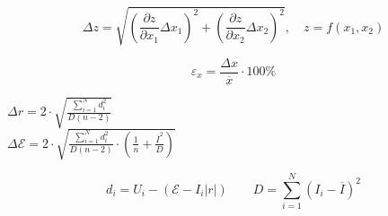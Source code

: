 \[
\Delta z = \sqrt{\left(\frac{\partial z}{\partial x_1} \Delta x_1\right)^2 + \left(\frac{\partial z}{\partial x_2} \Delta x_2\right)^2}, \quad z = f(x_1, x_2)
\]

\vspace{0.1cm}

\[
\varepsilon_x = \frac{\Delta x}{\overline{x}} \cdot 100\%
\]

\vspace{0.1cm}

\begin{center}
    $\Delta r = 2 \cdot \sqrt{\frac{\sum\limits_{i=1}^N d_i^2}{D (n-2)}}$ \\
    $\Delta \mathcal{E} = 2 \cdot \sqrt{\frac{\sum\limits_{i=1}^N d_i^2}{D (n-2)}\cdot \left(\frac{1}{n} + \frac{\overline{I}^2}{D}\right)}$
\end{center}

\[
d_i = U_i - (\mathcal{E} - I_i|r|) \quad \quad D = \sum\limits_{i=1}^N (I_i - \overline{I})^2
\]